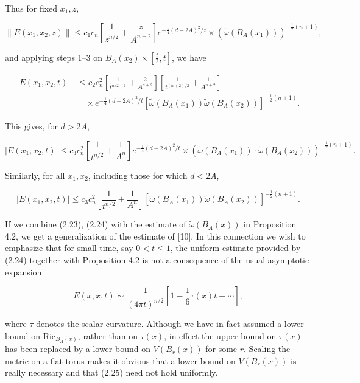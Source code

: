 \begin{example}
Thus for fixed $x_1, z$,

\begin{equation}\tag{2.21}
\|E(x_1,x_2,z)\| \le c_1 c_n \left[\frac{1}{z^{n/2}} + \frac{z}{A^{n+2}}\right] e^{-\frac14(d-2A)^2/z}
\times \left(\widetilde{\omega}(B_A(x_1))\right)^{-\frac12(n+1)},
\end{equation}

and applying steps 1--3 on $B_A(x_2)\times [\frac{t}{2},t]$, we have

\begin{equation}\tag{2.22}
\begin{aligned}
|E(x_1,x_2,t)|
&\le c_2 c_n^2
\left[\frac{1}{t^{n/2-1}}+\frac{2}{A^{n+2}}\right]
\left[\frac{1}{t^{(n+2)/2}}+\frac{1}{A^{n+2}}\right] \\
&\quad\times e^{-\frac{1}{4}(d-2A)^2/t}
[\tilde\omega(B_A(x_1))\tilde\omega(B_A(x_2))]^{-\frac{1}{2}(n+1)}.
\end{aligned}
\end{equation}

This gives, for $d>2A$,

\begin{equation}\tag{2.23}
|E(x_1,x_2,t)|
\le c_3 c_n^2
\left[\frac{1}{t^{n/2}}+\frac{1}{A^n}\right]
e^{-\frac{1}{4}(d-2A)^2/t}
\times (\tilde\omega(B_A(x_1))\cdot \tilde\omega(B_A(x_2)))^{-\frac{1}{2}(n+1)}.
\end{equation}

Similarly, for all $x_1,x_2$, including those for which $d<2A$,

\begin{equation}\tag{2.24}
|E(x_1,x_2,t)|
\le c_3 c_n^2
\left[\frac{1}{t^{n/2}}+\frac{1}{A^n}\right]
[\tilde\omega(B_A(x_1))\tilde\omega(B_A(x_2))]^{-\frac{1}{2}(n+1)}.
\end{equation}

If we combine (2.23), (2.24) with the estimate of $\tilde\omega(B_A(x))$ in Proposition
4.2, we get a generalization of the estimate of [10]. In this connection we wish
to emphasize that for small time, say $0<t\le 1$, the uniform estimate provided
by (2.24) together with Proposition 4.2 is not a consequence of the usual
asymptotic expansion

\begin{equation}\tag{2.25}
E(x,x,t)\sim \frac{1}{(4\pi t)^{n/2}}\left[1-\frac{1}{6}\tau(x)t+\cdots\right],
\end{equation}

where $\tau$ denotes the scalar curvature. Although we have in fact assumed a
lower bound on $\mathrm{Ric}_{B_A(x)}$, rather than on $\tau(x)$, in effect the upper bound on
$\tau(x)$ has been replaced by a lower bound on $V(B_r(x))$ for some $r$. Scaling the
metric on a flat torus makes it obvious that a lower bound on $V(B_r(x))$ is
really necessary and that (2.25) need not hold uniformly.


\end{example}
